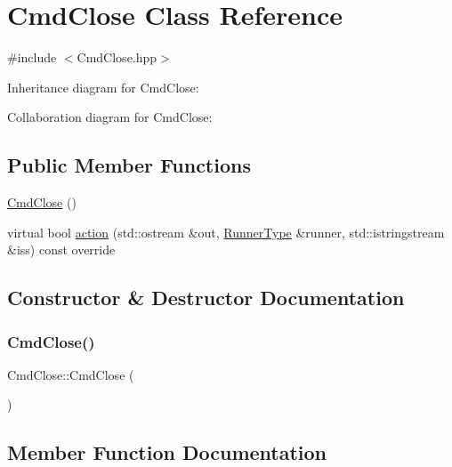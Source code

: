 \hypertarget{classCmdClose}{}\section{Cmd\+Close Class Reference}
\label{classCmdClose}


{\ttfamily \#include $<$Cmd\+Close.\+hpp$>$}



Inheritance diagram for Cmd\+Close\+:


Collaboration diagram for Cmd\+Close\+:
\subsection*{Public Member Functions}
\begin{DoxyCompactItemize}
\item 
\hyperlink{classCmdClose_ae4003b40d3f345043c36cd06654d1b37}{Cmd\+Close} ()
\item 
virtual bool \hyperlink{classCmdClose_a012e10635d377e533acfadf05e034654}{action} (std\+::ostream \&out, \hyperlink{Command_8hpp_ad45c3de597c2023a8be0399d914161f4}{Runner\+Type} \&runner, std\+::istringstream \&iss) const override
\end{DoxyCompactItemize}


\subsection{Constructor \& Destructor Documentation}
\mbox{\label{classCmdClose_ae4003b40d3f345043c36cd06654d1b37}} 
\subsubsection{\texorpdfstring{Cmd\+Close()}{CmdClose()}}
{\footnotesize\ttfamily Cmd\+Close\+::\+Cmd\+Close (\begin{DoxyParamCaption}{ }\end{DoxyParamCaption})}



\subsection{Member Function Documentation}
\mbox{\label{classCmdClose_a012e10635d377e533acfadf05e034654}} 
